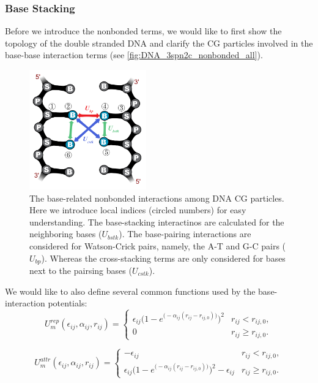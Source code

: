 \subsubsection{Base Stacking}
\label{sec:dna_3spn2c_potential_bstk}

Before we introduce the nonbonded terms, we would like to first show the
topology of the double stranded DNA and clarify the CG particles involved in the
base-base interaction terms (see \autoref{fig:DNA_3spn2c_nonbonded_all}).

\begin{figure}[ht]
  \centering
  \includegraphics[width=0.45\textwidth]{figures/DNA_3spn2c_nonbonded_all.png}
  \caption{The base-related nonbonded interactions among DNA CG particles.  Here
    we introduce local indices (circled numbers) for easy understanding.  The
    base-stacking interactinos are calculated for the neighboring bases
    ($U_{bstk}$).  The base-pairing interactions are considered for Watson-Crick
    pairs, namely, the A-T and G-C pairs ($U_{bp}$).  Whereas the cross-stacking
    terms are only considered for bases next to the pairsing bases ($U_{cstk}$).}
  \label{fig:DNA_3spn2c_nonbonded_all}
\end{figure}

We would like to also define several common functions used by the
base-interaction potentials:
\begin{equation}
  \label{eq:dna_3spn2c_nonlocal_base_rep}
  U_m^{rep}(\epsilon_{ij}, \alpha_{ij}, r_{ij}) =
  \begin{cases}
    \epsilon_{ij} \Big( 1-e^{\big(-\alpha_{ij}(r_{ij}-r_{ij,0})\big)} \Big)^2 & r_{ij} < r_{ij, 0}, \\[.5em]
    0 & r_{ij} \ge r_{ij, 0}.
  \end{cases}
\end{equation}

\begin{equation}
  \label{eq:dna_3spn2c_nonlocal_base_attr}
  U_m^{attr}(\epsilon_{ij}, \alpha_{ij}, r_{ij}) =
  \begin{cases}
    -\epsilon_{ij} & r_{ij} < r_{ij, 0}, \\[.5em]
    \epsilon_{ij} \Big(1-e^{\big(-\alpha_{ij}(r_{ij}-r_{ij,0})\big)} \Big)^2 - \epsilon_{ij} & r_{ij} \ge r_{ij, 0}.
  \end{cases}
\end{equation}

